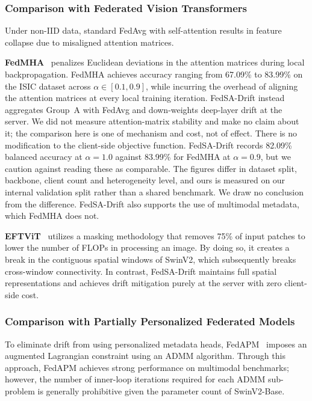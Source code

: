\documentclass[utf8]{FrontiersinHarvard} %
\newcommand{\sadrift}{FedSA-Drift}
\begin{document}
\subsubsection{Comparison with Federated Vision Transformers}

Under non-IID data, standard FedAvg with self-attention results in feature collapse due to misaligned attention matrices.

\textbf{FedMHA}~\citep{Darzi2024} penalizes Euclidean deviations in the attention matrices during local backpropagation. FedMHA achieves accuracy ranging from 67.09\% to 83.99\% on the ISIC dataset across $\alpha \in [0.1, 0.9]$, while incurring the overhead of aligning the attention matrices at every local training iteration. \sadrift{} instead aggregates Group~A with FedAvg and down-weights deep-layer drift at the server. We did not measure attention-matrix stability and make no claim about it; the comparison here is one of mechanism and cost, not of effect. There is no modification to the client-side objective function. \sadrift{} records 82.09\% balanced accuracy at $\alpha = 1.0$ against 83.99\% for FedMHA at $\alpha = 0.9$, but we caution against reading these as comparable. The figures differ in dataset split, backbone, client count and heterogeneity level, and ours is measured on our internal validation split rather than a shared benchmark. We draw no conclusion from the difference. \sadrift{} also supports the use of multimodal metadata, which FedMHA does not.

\textbf{EFTViT}~\citep{Wu2024} utilizes a masking methodology that removes 75\% of input patches to lower the number of FLOPs in processing an image. By doing so, it creates a break in the contiguous spatial windows of SwinV2, which subsequently breaks cross-window connectivity. In contrast, \sadrift{} maintains full spatial representations and achieves drift mitigation purely at the server with zero client-side cost.

\subsubsection{Comparison with Partially Personalized Federated Models}

To eliminate drift from using personalized metadata heads, FedAPM~\citep{Zhu2025} imposes an augmented Lagrangian constraint using an ADMM algorithm. Through this approach, FedAPM achieves strong performance on multimodal benchmarks; however, the number of inner-loop iterations required for each ADMM sub-problem is generally prohibitive given the parameter count of SwinV2-Base.
\end{document}
